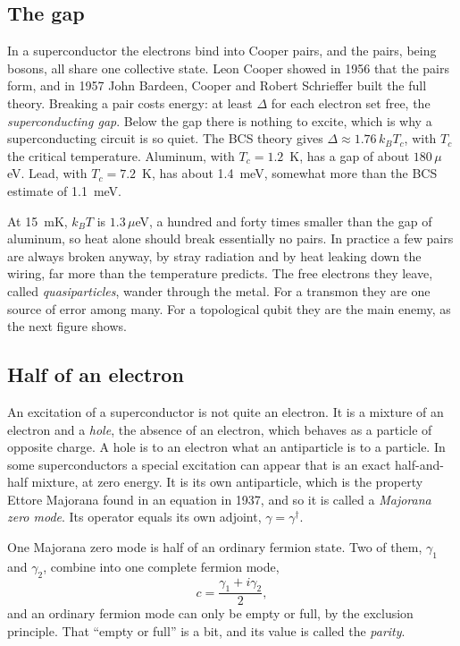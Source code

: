 \subsection*{The gap}

In a superconductor the electrons bind into Cooper pairs, and the pairs, being bosons, all
share one collective state. Leon Cooper showed in 1956 that the pairs form, and in 1957 John
Bardeen, Cooper and Robert Schrieffer built the full theory. Breaking a pair costs energy: at
least $\Delta$ for each electron set free, the \emph{superconducting gap}. Below the gap there
is nothing to excite, which is why a superconducting circuit is so quiet. The BCS theory gives
$\Delta \approx 1.76\,k_B T_c$, with $T_c$ the critical temperature. Aluminum, with $T_c =
1.2$~K, has a gap of about $180\,\mu$eV. Lead, with $T_c = 7.2$~K, has about 1.4~meV,
somewhat more than the BCS estimate of 1.1~meV.

At 15~mK, $k_B T$ is $1.3\,\mu$eV, a hundred and forty times smaller than the gap of
aluminum, so heat alone should break essentially no pairs. In practice a few pairs are always
broken anyway, by stray radiation and by heat leaking down the wiring, far more than the
temperature predicts. The free electrons they leave, called \emph{quasiparticles}, wander
through the metal. For a transmon they are one source of error among many. For a topological
qubit they are the main enemy, as the next figure shows.

\subsection*{Half of an electron}

An excitation of a superconductor is not quite an electron. It is a mixture of an electron and
a \emph{hole}, the absence of an electron, which behaves as a particle of opposite charge. A
hole is to an electron what an antiparticle is to a particle. In some superconductors a special
excitation can appear that is an exact half-and-half mixture, at zero energy. It is its own
antiparticle, which is the property Ettore Majorana found in an equation in 1937, and so it is
called a \emph{Majorana zero mode}. Its operator equals its own adjoint, $\gamma = \gamma^\dagger$.

One Majorana zero mode is half of an ordinary fermion state. Two of them, $\gamma_1$ and
$\gamma_2$, combine into one complete fermion mode,
\[
  c = \frac{\gamma_1 + i\gamma_2}{2},
\]
and an ordinary fermion mode can only be empty or full, by the exclusion principle. That
``empty or full'' is a bit, and its value is called the \emph{parity}.


